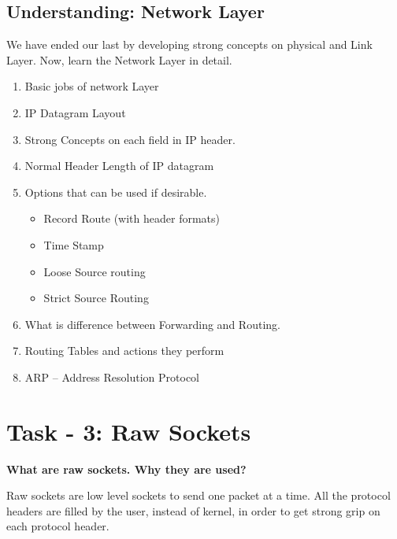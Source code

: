\documentclass[letterpaper,10pt,english]{sphinxmanual}
\begin{document}
\subsection{Understanding: Network Layer}
\label{week-06:understanding-network-layer}
We have ended our last by developing strong concepts on physical and Link Layer. Now, learn the Network Layer in detail.
\begin{enumerate}
\item {} 
Basic jobs of network Layer

\item {} 
IP Datagram Layout

\item {} 
Strong Concepts on each field in IP header.

\item {} 
Normal Header Length of IP datagram

\item {} 
Options that can be used if desirable.
\begin{itemize}
\item {} 
Record Route (with header formats)

\item {} 
Time Stamp

\item {} 
Loose Source routing

\item {} 
Strict Source Routing

\end{itemize}

\item {} 
What is difference between Forwarding and Routing.

\item {} 
Routing Tables and actions they perform

\item {} 
ARP – Address Resolution Protocol

\end{enumerate}


\section{Task - 3: Raw Sockets}
\label{week-06:task-3-raw-sockets}
\textbf{What are raw sockets. Why they are used?}

Raw sockets are low level sockets to send one packet at a time. All the protocol headers are filled by the user, instead of kernel, in order to get strong grip on each protocol header.
\end{document}

